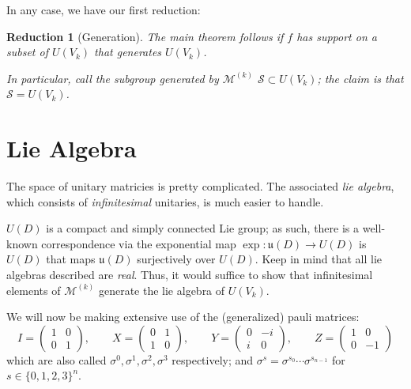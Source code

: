 \documentclass[fleqn,12pt]{article}
\newtheorem{reduction}{Reduction}
\begin{document}
In any case, we have our first reduction:
\begin{reduction}
    [Generation]
    The main theorem follows if $f$ has support on a subset of $U(V_k)$
    that generates $U(V_k)$.

    In particular, call the subgroup generated by $\mathcal{M}^{(k)}$
    $\mathcal{S}\subset U(V_k)$; the claim is that $\mathcal{S} = U(V_k)$.

\end{reduction}

\section{Lie Algebra}

The space of unitary matricies is pretty complicated. The associated \emph{lie algebra},
which consists of \emph{infinitesimal} unitaries, is much easier to handle.

$U(D)$ is a compact and simply connected Lie group; as such, there is a well-known correspondence
via the exponential map $\exp : \mathfrak{u}(D) \to U(D)$ is $U(D)$
that maps $\mathfrak{u}(D)$ surjectively over $U(D)$. Keep in mind that all lie algebras
described are \emph{real}. Thus, it would suffice to show that infinitesimal elements
of $\mathcal{M}^{(k)}$ generate the
lie algebra of $U(V_k)$.


We will now be making extensive use of the (generalized) pauli matrices:
\[
    I = \begin{pmatrix}
        1 & 0 \\ 0 & 1
    \end{pmatrix},\qquad
    X = \begin{pmatrix}
        0 & 1 \\ 1 & 0
    \end{pmatrix},\qquad
    Y = \begin{pmatrix}
        0 & -i \\ i & 0
    \end{pmatrix},\qquad
    Z = \begin{pmatrix}
        1 & 0 \\ 0 & -1
    \end{pmatrix}
\]
which are also called $\sigma^0, \sigma^1, \sigma^2, \sigma^3$ respectively;
and $\sigma^s = \sigma^{s_0}\cdots \sigma^{s_{n-1}}$ for $s\in \{0,1,2,3\}^n$.
\end{document}
